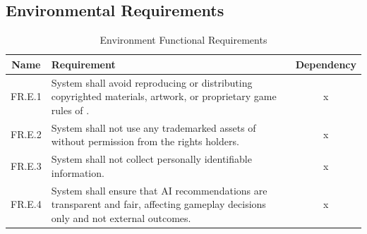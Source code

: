\documentclass{article}
\begin{document}
\subsection*{Environmental Requirements}
\begin{table}[h!]
    \centering
    \begin{tabular}{|c|p{10cm}|c|}
    \hline
    \textbf{Name} & \textbf{Requirement} & \textbf{Dependency} \\
    \hline
    FR.E.1 & System shall avoid reproducing or distributing copyrighted materials, artwork, or proprietary game rules of \emph{\Catan{}}. & x \\
    \hline
    FR.E.2 & System shall not use any trademarked assets of \emph{\Catan{}} without permission from the rights holders. & x \\
    \hline
    FR.E.3 & System shall not collect personally identifiable information. & x \\
    \hline
    FR.E.4 & System shall ensure that AI recommendations are transparent and fair, affecting gameplay decisions only and not external outcomes. & x \\
    \hline
    \end{tabular}
    \caption{Environment Functional Requirements}
    \label{tab:fr}
\end{table}
\end{document}
